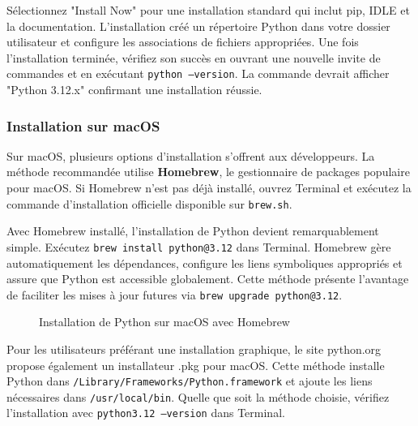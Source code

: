 Sélectionnez "Install Now" pour une installation standard qui inclut pip, IDLE et la documentation. L'installation créé un répertoire Python dans votre dossier utilisateur et configure les associations de fichiers appropriées. Une fois l'installation terminée, vérifiez son succès en ouvrant une nouvelle invite de commandes et en exécutant \texttt{python --version}. La commande devrait afficher "Python 3.12.x" confirmant une installation réussie.

\subsubsection{Installation sur macOS}

Sur macOS, plusieurs options d'installation s'offrent aux développeurs. La méthode recommandée utilise \textbf{Homebrew}, le gestionnaire de packages populaire pour macOS. Si Homebrew n'est pas déjà installé, ouvrez Terminal et exécutez la commande d'installation officielle disponible sur \texttt{brew.sh}.

Avec Homebrew installé, l'installation de Python devient remarquablement simple. Exécutez \texttt{brew install python@3.12} dans Terminal. Homebrew gère automatiquement les dépendances, configure les liens symboliques appropriés et assure que Python est accessible globalement. Cette méthode présente l'avantage de faciliter les mises à jour futures via \texttt{brew upgrade python@3.12}.

\begin{figure}[h]
\centering
{}
\caption{Installation de Python sur macOS avec Homebrew}
\end{figure}

Pour les utilisateurs préférant une installation graphique, le site python.org propose également un installateur .pkg pour macOS. Cette méthode installe Python dans \texttt{/Library/Frameworks/Python.framework} et ajoute les liens nécessaires dans \texttt{/usr/local/bin}. Quelle que soit la méthode choisie, vérifiez l'installation avec \texttt{python3.12 --version} dans Terminal.

